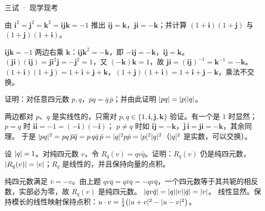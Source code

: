 \documentclass[cjk=noto, seal=first]{mojing-exam}
\begin{document}
\begin{paper}[time={建议 2.5 小时，含阅读（训练设置）}, full=100]{三试 · 现学现考}
\begin{questions}
\question[6] 由 $\mathbf i^2=\mathbf j^2=\mathbf k^2=\mathbf i\mathbf j\mathbf k=-1$ 推出 $\mathbf i\mathbf j=\mathbf k$，$\mathbf j\mathbf i=-\mathbf k$；并计算 $(1+\mathbf i)(1+\mathbf j)$ 与 $(1+\mathbf j)(1+\mathbf i)$。
\answerspace{2.5cm}
\begin{solution}
$\mathbf i\mathbf j\mathbf k=-1$ 两边右乘 $\mathbf k$：$\mathbf i\mathbf j\mathbf k^2=-\mathbf k$，即 $-\mathbf i\mathbf j=-\mathbf k$，$\mathbf i\mathbf j=\mathbf k$。
$(\mathbf j\mathbf i)(\mathbf i\mathbf j)=\mathbf j\mathbf i^2\mathbf j=-\mathbf j^2=1$，又 $(-\mathbf k)\mathbf k=1$，故 $\mathbf j\mathbf i=(\mathbf i\mathbf j)^{-1}=\mathbf k^{-1}=-\mathbf k$。
$(1+\mathbf i)(1+\mathbf j)=1+\mathbf i+\mathbf j+\mathbf k$，$(1+\mathbf j)(1+\mathbf i)=1+\mathbf i+\mathbf j-\mathbf k$，乘法不交换。
\end{solution}

\question[8] 证明：对任意四元数 $p,q$，$\overline{pq}=\bar q\,\bar p$；并由此证明 $\lvert pq\rvert=\lvert p\rvert\lvert q\rvert$。
\answerspace{2.5cm}
\begin{solution}
两边都对 $p$、$q$ 是实线性的，只需对 $p,q\in\{1,\mathbf i,\mathbf j,\mathbf k\}$ 验证。有一个是 $1$ 时显然；$p=q$ 时 $\overline{\mathbf i\mathbf i}=-1=(-\mathbf i)(-\mathbf i)$；
$p\ne q$ 时如 $\overline{\mathbf i\mathbf j}=-\mathbf k$，$\bar{\mathbf j}\,\bar{\mathbf i}=\mathbf j\mathbf i=-\mathbf k$，其余同理。
于是 $\lvert pq\rvert^2=pq\,\overline{pq}=p\,q\bar q\,\bar p=\lvert q\rvert^2p\bar p=\lvert p\rvert^2\lvert q\rvert^2$（$\lvert q\rvert^2$ 是实数，可以交换）。
\end{solution}

\question[10] 设 $\lvert q\rvert=1$。对纯四元数 $v$，令 $R_q(v)=qv\bar q$。证明：$R_q(v)$ 仍是纯四元数，$\lvert R_q(v)\rvert=\lvert v\rvert$；$R_q$ 是线性的，并且保持向量的点积。
\answerspace{2.5cm}
\begin{solution}
纯四元数满足 $\bar v=-v$。由上题 $\overline{qv\bar q}=q\bar v\bar q=-qv\bar q$，一个四元数等于其共轭的相反数，实部必为零，故 $R_q(v)$ 是纯四元数。
$\lvert qv\bar q\rvert=\lvert q\rvert\lvert v\rvert\lvert\bar q\rvert=\lvert v\rvert$。
线性显然。保持模长的线性映射保持点积：$u\cdot v=\frac14\bigl(\lvert u+v\rvert^2-\lvert u-v\rvert^2\bigr)$。
\end{solution}


\end{questions}
\end{paper}
\end{document}
